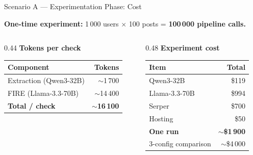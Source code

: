 \documentclass[11pt, aspectratio=169]{beamer}
\begin{document}
\begin{frame}{Scenario A — Experimentation Phase: Cost}

  \textbf{One-time experiment:} 1\,000 users $\times$ 100 posts = \textbf{100\,000 pipeline calls.}

  \bigskip
  \begin{columns}[T]
    \begin{column}{0.44\textwidth}
      \textbf{Tokens per check}\\[6pt]
      \renewcommand{\arraystretch}{1.3}
      \begin{tabular}{lr}
        \toprule
        Component & Tokens \\
        \midrule
        Extraction (Qwen3-32B)   & $\sim$1\,700 \\
        FIRE (Llama-3.3-70B)     & $\sim$14\,400 \\
        \midrule
        \textbf{Total / check}   & \textbf{$\sim$16\,100} \\
        \bottomrule
      \end{tabular}
    \end{column}
    \begin{column}{0.48\textwidth}
      \textbf{Experiment cost}\\[6pt]
      \renewcommand{\arraystretch}{1.3}
      \begin{tabular}{lr}
        \toprule
        Item & Total \\
        \midrule
        Qwen3-32B            & \$119  \\
        Llama-3.3-70B        & \$994  \\
        Serper               & \$700  \\
        Hosting              & \$50   \\
        \midrule
        \textbf{One run}     & \textbf{$\sim$\$1\,900} \\
        3-config comparison  & $\sim$\$4\,000 \\
        \bottomrule
      \end{tabular}
    \end{column}
  \end{columns}
\end{frame}
\end{document}
